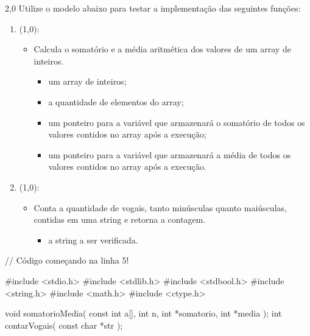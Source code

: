 \documentclass[
    12pt,     
    openright,
    twoside,  
    a4paper,  
    english,  
    brazil,   
]{memoir}
\begin{document}
\begin{questaoProgramacao}{2,0}{}{}
    Utilize o modelo abaixo para testar a implementação das seguintes funções:
    
    \begin{enumerate}
    
        \item {} (1,0):
        \begin{itemize}
            \item Calcula o somatório e a média aritmética dos valores de um array de inteiros.
            \begin{itemize}
                \item {} um array de inteiros;
                \item {} a quantidade de elementos do array;
                \item {} um ponteiro para a variável que armazenará o somatório de todos os valores contidos no array após a execução;
                \item {} um ponteiro para a variável que armazenará a média de todos os valores contidos no array após a execução.
            \end{itemize}
        \end{itemize}
        
        \item {} (1,0):
        \begin{itemize}
            \item Conta a quantidade de vogais, tanto minúsculas quanto maiúsculas, contidas em uma string e retorna a contagem.
            \begin{itemize}
                \item {} a string a ser verificada.
            \end{itemize}
        \end{itemize}
        
    \end{enumerate}
    
\begin{blocoC}[\normalsize][5]
// Código começando na linha 5!

#include <stdio.h>
#include <stdlib.h>
#include <stdbool.h>
#include <string.h>
#include <math.h>
#include <ctype.h>

void somatorioMedia( const int a[], int n, int *somatorio, int *media );
int contarVogais( const char *str );


\end{blocoC}
\end{questaoProgramacao}
\end{document}
